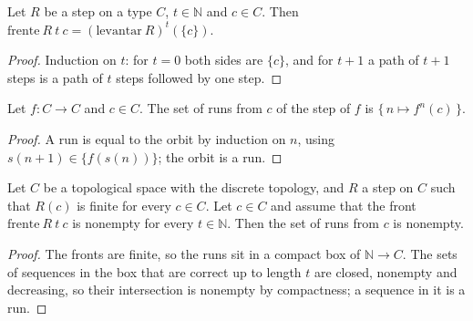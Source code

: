 \begin{theorem}
  \label{thm:dynamics-front-iterate}
  \leanok
  Let $R$ be a step on a type $C$, $t \in \mathbb{N}$ and $c \in C$. Then
  $\mathrm{frente}\ R\ t\ c = (\mathrm{levantar}\ R)^{t}(\{c\})$.
  \own{}
\end{theorem}

\begin{proof}
  \leanok
  Induction on $t$: for $t = 0$ both sides are $\{c\}$, and for $t+1$ a path of $t+1$ steps is a
  path of $t$ steps followed by one step.
\end{proof}

\begin{theorem}
  \label{thm:dynamics-single-run}
  \leanok
  Let $f : C \to C$ and $c \in C$. The set of runs from $c$ of the step of $f$ is
  $\{\, n \mapsto f^{n}(c) \,\}$.
  \own{}
\end{theorem}

\begin{proof}
  \leanok
  A run is equal to the orbit by induction on $n$, using $s(n+1) \in \{f(s(n))\}$; the orbit is a run.
\end{proof}

\begin{theorem}
  \label{thm:dynamics-konig}
  \leanok
  Let $C$ be a topological space with the discrete topology, and $R$ a step on $C$ such that
  $R(c)$ is finite for every $c \in C$. Let $c \in C$ and assume that the front
  $\mathrm{frente}\ R\ t\ c$ is nonempty for every $t \in \mathbb{N}$. Then the set of runs from $c$
  is nonempty.
  \own{}
\end{theorem}

\begin{proof}
  \leanok
  The fronts are finite, so the runs sit in a compact box of $\mathbb{N} \to C$. The sets of
  sequences in the box that are correct up to length $t$ are closed, nonempty and decreasing, so
  their intersection is nonempty by compactness; a sequence in it is a run.
\end{proof}

